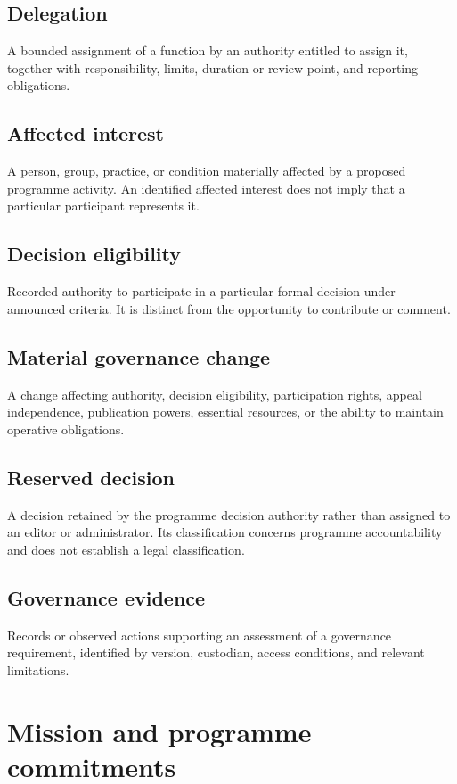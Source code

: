 \documentclass[11pt,a4paper]{article}
\begin{document}
\subsection{Delegation}
A bounded assignment of a function by an authority entitled to assign it, together with responsibility, limits, duration or review point, and reporting obligations.

\subsection{Affected interest}
A person, group, practice, or condition materially affected by a proposed programme activity. An identified affected interest does not imply that a particular participant represents it.

\subsection{Decision eligibility}
Recorded authority to participate in a particular formal decision under announced criteria. It is distinct from the opportunity to contribute or comment.

\subsection{Material governance change}
A change affecting authority, decision eligibility, participation rights, appeal independence, publication powers, essential resources, or the ability to maintain operative obligations.

\subsection{Reserved decision}
A decision retained by the programme decision authority rather than assigned to an editor or administrator. Its classification concerns programme accountability and does not establish a legal classification.

\subsection{Governance evidence}
Records or observed actions supporting an assessment of a governance requirement, identified by version, custodian, access conditions, and relevant limitations.

\section{Mission and programme commitments}
\end{document}

